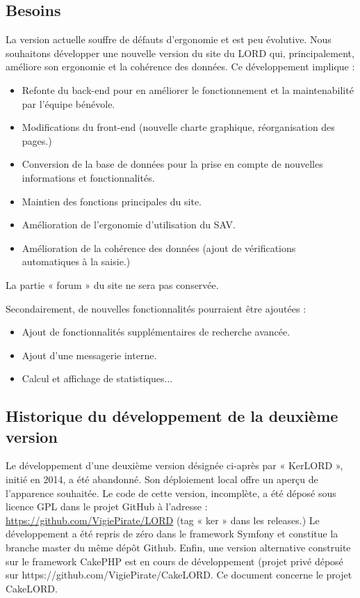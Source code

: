 \documentclass[a4paper,10pt]{article}
\begin{document}
\subsection{Besoins}
La version actuelle souffre de défauts d'ergonomie et est peu évolutive. Nous souhaitons développer une nouvelle version du site du LORD qui, principalement, améliore son ergonomie et la cohérence des données. Ce développement implique :

\begin{itemize}
\item Refonte du back-end pour en améliorer le fonctionnement et la maintenabilité par l'équipe bénévole.
\item Modifications du front-end (nouvelle charte graphique, réorganisation des pages.)
\item Conversion de la base de données pour la prise en compte de nouvelles informations et fonctionnalités. 
\item Maintien des fonctions principales du site.
\item Amélioration de l'ergonomie d'utilisation du SAV.
\item Amélioration de la cohérence des données (ajout de vérifications automatiques à la saisie.)
\end{itemize}

La partie « forum » du site ne sera pas conservée.   

Secondairement, de nouvelles fonctionnalités pourraient être ajoutées :
\begin{itemize}
\item Ajout de fonctionnalités supplémentaires de recherche avancée.
\item Ajout d'une messagerie interne.
\item Calcul et affichage de statistiques...
\end{itemize}

\subsection{Historique du développement de la deuxième version}

Le développement d’une deuxième version désignée ci-après par « KerLORD », initié en 2014, a été abandonné. Son déploiement local offre un aperçu de l’apparence souhaitée. Le code de cette version, incomplète, a été
déposé sous licence GPL dans le projet GitHub à l’adresse : \url{https://github.com/VigiePirate/LORD} (tag « ker » dans les releases.) Le développement a été repris de zéro dans le framework Symfony et constitue la branche master du même dépôt Github. Enfin, une version alternative construite sur le framework CakePHP est en cours de développement (projet privé déposé sur https://github.com/VigiePirate/CakeLORD. Ce document
concerne le projet CakeLORD.
\end{document}
